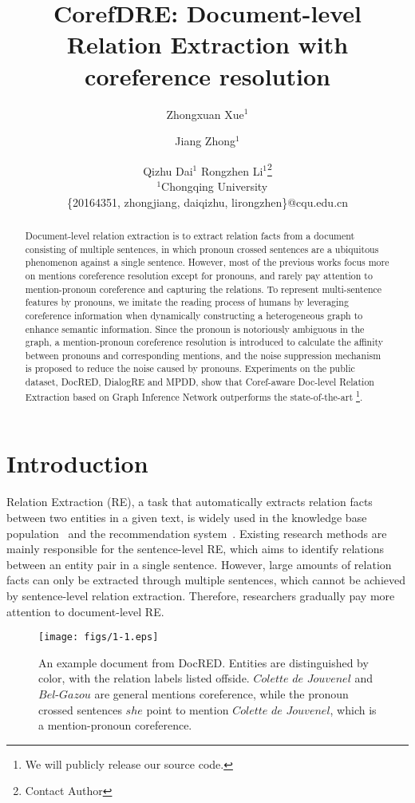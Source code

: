 \documentclass{article}
\title{CorefDRE: Document-level Relation Extraction with coreference resolution}
\author{
Zhongxuan Xue$^1$\and
Jiang Zhong$^1$\and
Qizhu Dai$^1$\And
Rongzhen Li$^1$\footnote{Contact Author}\\\
\affiliations
$^1$Chongqing University\\
\emails
\{20164351, zhongjiang, daiqizhu, lirongzhen\}@cqu.edu.cn
}
\begin{document}
\maketitle

\begin{abstract}
Document-level relation extraction is to extract relation facts from a document consisting of multiple sentences, in which pronoun crossed sentences are a ubiquitous phenomenon against a single sentence. However, most of the previous works focus more on mentions coreference resolution except for pronouns, and rarely pay attention to mention-pronoun coreference and capturing the relations. To represent multi-sentence features by pronouns, we imitate the reading process of humans by leveraging coreference information when dynamically constructing a heterogeneous graph to enhance semantic information. Since the pronoun is notoriously ambiguous in the graph, a mention-pronoun coreference resolution is introduced to calculate the affinity between pronouns and corresponding mentions, and the noise suppression mechanism is proposed to reduce the noise caused by pronouns. Experiments on the public dataset, DocRED, DialogRE and MPDD, show that Coref-aware Doc-level Relation Extraction based on Graph Inference Network outperforms the state-of-the-art \footnote{We will publicly release our source code.}.
\end{abstract}
\section{Introduction}

Relation Extraction (RE), a task that automatically extracts relation facts between two entities in a given text, is widely used in the knowledge base population~\cite{zhang2017position} and the recommendation system~\cite{zhang2021causerec}. Existing research methods are mainly  responsible for the sentence-level RE, which aims to identify relations between an entity pair in a single sentence. However, large amounts of relation facts can only be extracted through multiple sentences, which cannot be achieved by sentence-level relation extraction. Therefore, researchers gradually pay more attention to document-level RE.

\begin{figure}[ht]
    \centering
    \setlength{\abovecaptionskip}{0cm}
\setlength{\belowcaptionskip}{-0.4cm}
    \texttt{[image: figs/1-1.eps]}
    \caption{An example document from DocRED. Entities are distinguished by color, with the relation labels listed offside. $Colette$ $de$ $Jouvenel$ and $Bel$-$Gazou$ are general mentions coreference, while the pronoun crossed sentences $she$ point to mention $ Colette$ $de$ $Jouvenel$, which is a mention-pronoun coreference.}
    \label{fig1}
\end{figure}
\end{document}
